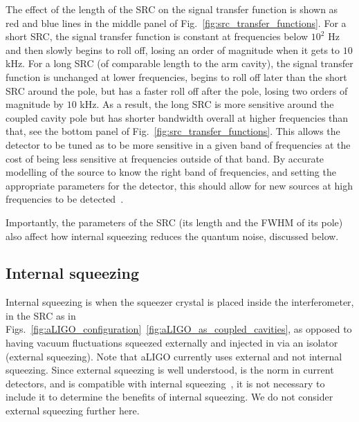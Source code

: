 \documentclass[aps,pra,superscriptaddress,reprint,nofootinbib]{revtex4-1}
\begin{document}
The effect of the length of the SRC on the signal transfer function is shown as red and blue lines in the middle panel of Fig.~\ref{fig:src_transfer_functions}.
For a short SRC, the signal transfer function is constant at frequencies below $10^2$ Hz and then slowly begins to roll off, losing an order of magnitude when it gets to $10$ kHz. For a long SRC (of comparable length to the arm cavity), the signal transfer function is unchanged at lower frequencies, begins to roll off later than the short SRC around the pole, but has a faster roll off after the pole, losing two orders of magnitude by $10$ kHz. As a result, the long SRC is more sensitive around the coupled cavity pole but has shorter bandwidth overall at higher frequencies than that, see the bottom panel of Fig.~\ref{fig:src_transfer_functions}. This allows the detector to be tuned as to be more sensitive in a given band of frequencies at the cost of being less sensitive at frequencies outside of that band. By accurate modelling of the source to know the right band of frequencies, and setting the appropriate parameters for the detector, this should allow for new sources at high frequencies to be detected~\cite{Adya_2020}.


Importantly, the parameters of the SRC (its length and the FWHM of its pole) also affect how internal squeezing reduces the quantum noise, discussed below.

\subsection{Internal squeezing}
\label{sec:internal_squeezing}

Internal squeezing is when the squeezer crystal is placed inside the interferometer, in the SRC as in Figs.~\ref{fig:aLIGO_configuration}~\ref{fig:aLIGO_as_coupled_cavities}, as opposed to having vacuum fluctuations squeezed externally and injected in via an isolator (external squeezing). Note that aLIGO currently uses external and not internal squeezing. Since external squeezing is well understood, is the norm in current detectors, and is compatible with internal squeezing~\cite{Adya_2020,Korobko_2019}, it is not necessary to include it to determine the benefits of internal squeezing.
We do not consider external squeezing further here.
\end{document}
